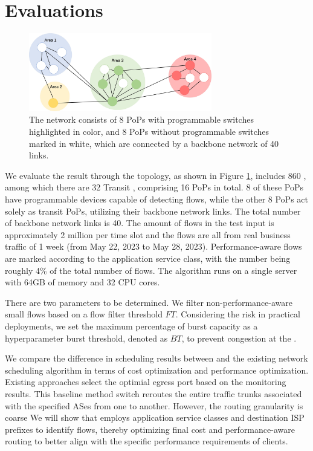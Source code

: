 

\section{Evaluations} \label{Evaluation}

\begin{figure}
	\centering
	\includegraphics[width = 8cm]{figs/architecture/Topology.jpg}
	\caption{\small The network consists of 8 PoPs with programmable switches highlighted in color, and 8 PoPs without programmable switches marked in white, which are connected by a backbone network of 40 links.}
	\label{fig:topo}
\end{figure}

We evaluate the result through the topology, as shown in Figure \ref{fig:topo}, includes 860 {\egresses}, among which there are 32 Transit {\egresses}, comprising 16 PoPs in total. 8 of these PoPs have programmable devices capable of detecting flows, while the other 8 PoPs act solely as transit PoPs, utilizing their backbone network links. The total number of backbone network links is 40. The amount of flows in the test input is approximately 2 million per time slot and the flows are all from real business traffic of 1 week (from May 22, 2023 to May 28, 2023). Performance-aware flows are marked according to the application service class, with the number being roughly 4\% of the total number of flows. The algorithm runs on a single server with 64GB of memory and 32 CPU cores.



There are two parameters to be determined. We filter non-performance-aware small flows based on a flow filter threshold $FT$. 
Considering the risk in practical deployments, we set the maximum percentage of {\egress} burst capacity as a hyperparameter burst threshold, denoted as $BT$, to prevent congestion at the {\egresses}.

We compare the difference in scheduling results between {\sys} and the existing network scheduling algorithm in terms of cost optimization and performance optimization. Existing approaches select the optimial egress port based on the monitoring results.   This baseline method switch reroutes the entire traffic trunks associated with the specified ASes from one {\egress} to another. However, the routing granularity is coarse  We will show that {\sys} employs application service classes and destination ISP prefixes to identify flows, thereby optimizing final cost and performance-aware routing to better align with the specific performance requirements of clients.

